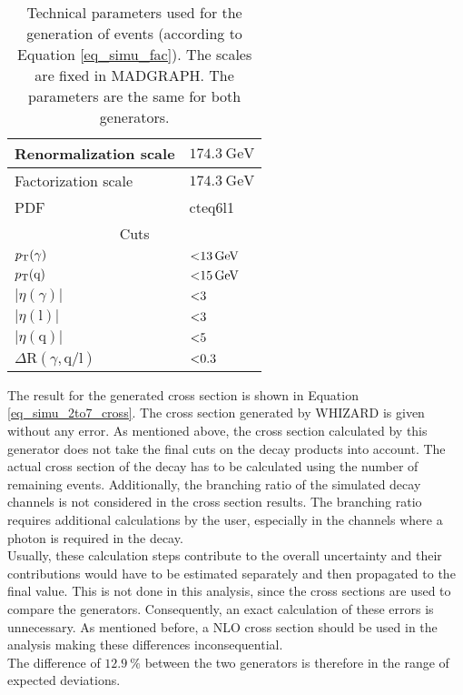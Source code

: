 \begin{table}[ht]
\centering
    \caption{Technical parameters used for the generation of \ttgamma events (according to\\ Equation \ref{eq_simu_fac}). The scales are fixed in MADGRAPH. The parameters are the same for both generators.}
    \begin{tabular}{| l | l |}

    \hline
    Renormalization scale & $ \SI{174.3}{\giga \electronvolt} $ \\
    \hline
    Factorization scale & $ \SI{174.3}{\giga \electronvolt} $ \\
    \hline
    PDF & cteq6l1 \\
    \hline
    \multicolumn{2}{|c|}{Cuts} \\
    \hline
    $p_{\mathrm{T}}(\gamma)$ & $\SI{<13}{\giga \electronvolt}$ \\
    \hline
    $p_{\mathrm{T}}(\mathrm{q})$ & $\SI{<15}{\giga \electronvolt}$ \\
    \hline
    $| \eta(\gamma)|$ & $\SI{<3}{}$ \\
    \hline
    $| \eta(\mathrm{l})|$ & $\SI{<3}{}$ \\
    \hline
    $| \eta(\mathrm{q})|$ & $\SI{<5}{}$ \\
    \hline
    $\Delta \mathrm{R}(\gamma,\mathrm{q/l})$ & $\num{<0.3}$ \\
    \hline
    \end{tabular}
     \label{tab_simu_2to7}
\end{table}

The result for the generated cross section is shown in Equation \ref{eq_simu_2to7_cross}. 
The cross section generated by WHIZARD is given without any error. As mentioned above, the cross section calculated by this generator does not take the final cuts on the decay products into account. The actual cross section of the decay has to be calculated using the number of remaining events. Additionally, the branching ratio of the simulated decay channels is not considered in the cross section results. The branching ratio requires additional calculations by the user, especially in the channels where a photon is required in the decay. \\
Usually, these calculation steps contribute to the overall uncertainty and their contributions would have to be estimated separately and then propagated to the final value. This is not done in this analysis, since the cross sections are used to compare the generators. Consequently, an exact calculation of these errors is unnecessary. As mentioned before, a NLO cross section should be used in the analysis making these differences inconsequential. \\
The difference of $\SI{12.9}{\percent}$ between the two generators is therefore in the range of expected deviations. 


